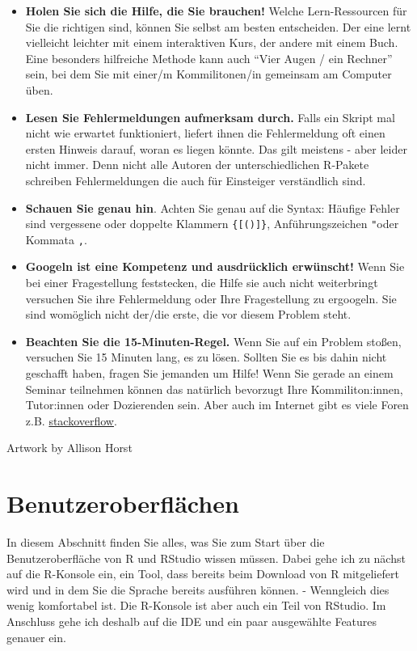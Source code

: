 \documentclass[
]{book}
\begin{document}
\begin{itemize}
\item
  \textbf{Holen Sie sich die Hilfe, die Sie brauchen!}
  Welche Lern-Ressourcen für Sie die richtigen sind, können Sie selbst am besten entscheiden. Der eine lernt vielleicht leichter mit einem interaktiven Kurs, der andere mit einem Buch. Eine besonders hilfreiche Methode kann auch ``Vier Augen / ein Rechner'' sein, bei dem Sie mit einer/m Kommilitonen/in gemeinsam am Computer üben.
\item
  \textbf{Lesen Sie Fehlermeldungen aufmerksam durch.}
  Falls ein Skript mal nicht wie erwartet funktioniert, liefert ihnen die Fehlermeldung oft einen ersten Hinweis darauf, woran es liegen könnte. Das gilt meistens - aber leider nicht immer. Denn nicht alle Autoren der unterschiedlichen R-Pakete schreiben Fehlermeldungen die auch für Einsteiger verständlich sind.
\item
  \textbf{Schauen Sie genau hin}.
  Achten Sie genau auf die Syntax: Häufige Fehler sind vergessene oder doppelte Klammern \texttt{\{{[}(){]}\}}, Anführungszeichen \texttt{"}oder Kommata \texttt{,}.
\item
  \textbf{Googeln ist eine Kompetenz und ausdrücklich erwünscht!}
  Wenn Sie bei einer Fragestellung feststecken, die Hilfe sie auch nicht weiterbringt versuchen Sie ihre Fehlermeldung oder Ihre Fragestellung zu ergoogeln. Sie sind womöglich nicht der/die erste, die vor diesem Problem steht.
\item
  \textbf{Beachten Sie die 15-Minuten-Regel.}
  Wenn Sie auf ein Problem stoßen, versuchen Sie 15 Minuten lang, es zu lösen. Sollten Sie es bis dahin nicht geschafft haben, fragen Sie jemanden um Hilfe! Wenn Sie gerade an einem Seminar teilnehmen können das natürlich bevorzugt Ihre Kommiliton:innen, Tutor:innen oder Dozierenden sein. Aber auch im Internet gibt es viele Foren z.B. \href{https://stackoverflow.com/}{stackoverflow}.
\end{itemize}

Artwork by Allison Horst

\hypertarget{benutzeroberfluxe4chen}{%
\chapter{Benutzeroberflächen}\label{benutzeroberfluxe4chen}}

In diesem Abschnitt finden Sie alles, was Sie zum Start über die Benutzeroberfläche von R und RStudio wissen müssen. Dabei gehe ich zu nächst auf die R-Konsole ein, ein Tool, dass bereits beim Download von R mitgeliefert wird und in dem Sie die Sprache bereits ausführen können. - Wenngleich dies wenig komfortabel ist. Die R-Konsole ist aber auch ein Teil von RStudio. Im Anschluss gehe ich deshalb auf die IDE und ein paar ausgewählte Features genauer ein.
\end{document}
